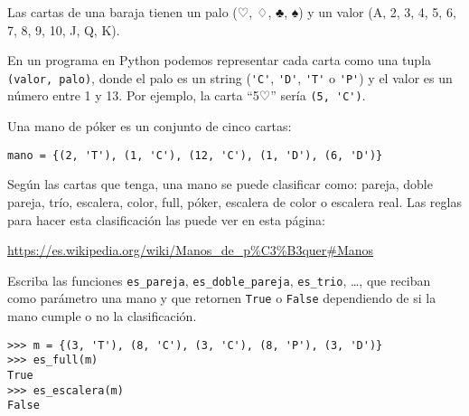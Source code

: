 Las cartas de una baraja tienen
un palo (♡, ♢, ♣, ♠)
y un valor (A, 2, 3, 4, 5, 6, 7, 8, 9, 10, J, Q, K).

En un programa en Python
podemos representar cada carta
como una tupla \texttt{(valor, palo)},
donde el palo es un string
(\lstinline!'C'!, \lstinline!'D'!, \lstinline!'T'! o \lstinline!'P'!)
y el valor es un número entre 1 y 13.
Por ejemplo,
la carta ``5♡'' sería \lstinline!(5, 'C')!.

Una mano de póker es un conjunto de cinco cartas:
\begin{lstlisting}
mano = {(2, 'T'), (1, 'C'), (12, 'C'), (1, 'D'), (6, 'D')}
\end{lstlisting}

Según las cartas que tenga,
una mano se puede clasificar como:
pareja, doble pareja, trío, escalera,
color, full, póker, escalera de color o escalera real.
Las reglas para hacer esta clasificación
las puede ver en esta página:

\url{https://es.wikipedia.org/wiki/Manos_de_p%C3%B3quer#Manos}

Escriba las funciones
\lstinline!es_pareja!,
\lstinline!es_doble_pareja!,
\lstinline!es_trio!,
\dots,
que reciban como parámetro una mano
y que retornen \verb!True! o \verb!False!
depen\-diendo de si la mano cumple o no la clasificación.
\begin{lstlisting}
>>> m = {(3, 'T'), (8, 'C'), (3, 'C'), (8, 'P'), (3, 'D')}
>>> es_full(m)
True
>>> es_escalera(m)
False
\end{lstlisting}
